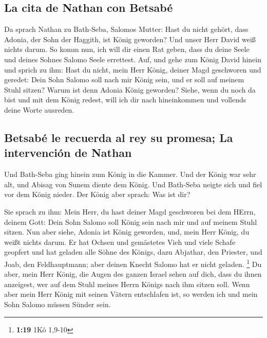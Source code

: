 \hypertarget{la-cita-de-nathan-con-betsabuxe9}{%
\subsection{La cita de Nathan con
Betsabé}\label{la-cita-de-nathan-con-betsabuxe9}}

 Da sprach Nathan zu Bath-Seba, Salomos Mutter: Hast du
nicht gehört, dass Adonia, der Sohn der Haggith, ist König geworden? Und
unser Herr David weiß nichts darum.  So komm nun, ich
will dir einen Rat geben, dass du deine Seele und deines Sohnes Salomo
Seele errettest.  Auf, und gehe zum König David hinein
und sprich zu ihm: Hast du nicht, mein Herr König, deiner Magd
geschworen und geredet: Dein Sohn Salomo soll nach mir König sein, und
er soll auf meinem Stuhl sitzen? Warum ist denn Adonia König geworden?
 Siehe, wenn du noch da bist und mit dem König redest,
will ich dir nach hineinkommen und vollends deine Worte ausreden.

\hypertarget{betsabuxe9-le-recuerda-al-rey-su-promesa-la-intervenciuxf3n-de-nathan}{%
\subsection{Betsabé le recuerda al rey su promesa; La intervención de
Nathan}\label{betsabuxe9-le-recuerda-al-rey-su-promesa-la-intervenciuxf3n-de-nathan}}

 Und Bath-Seba ging hinein zum König in die Kammer. Und
der König war sehr alt, und Abisag von Sunem diente dem König.
 Und Bath-Seba neigte sich und fiel vor dem König nieder.
Der König aber sprach: Was ist dir?

 Sie sprach zu ihm: Mein Herr, du hast deiner Magd
geschworen bei dem HErrn, deinem Gott: Dein Sohn Salomo soll König sein
nach mir und auf meinem Stuhl sitzen.  Nun aber siehe,
Adonia ist König geworden, und, mein Herr König, du weißt nichts darum.
 Er hat Ochsen und gemästetes Vieh und viele Schafe
geopfert und hat geladen alle Söhne des Königs, dazu Abjathar, den
Priester, und Joab, den Feldhauptmann; aber deinen Knecht Salomo hat er
nicht geladen. \footnote{\textbf{1:19} 1Kö 1,9-10}  Du
aber, mein Herr König, die Augen des ganzen Israel sehen auf dich, dass
du ihnen anzeigest, wer auf dem Stuhl meines Herrn Königs nach ihm
sitzen soll.  Wenn aber mein Herr König mit seinen Vätern
entschlafen ist, so werden ich und mein Sohn Salomo müssen Sünder sein.

